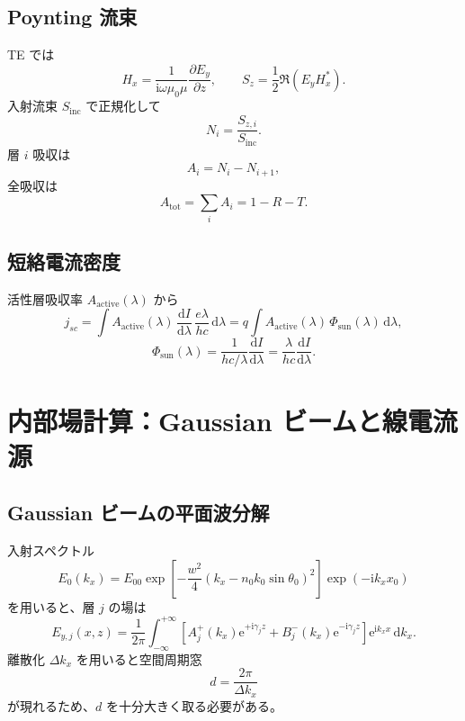\documentclass[a4paper,11pt]{article}
\newcommand{\ii}{\mathrm{i}}
\newcommand{\ee}{\mathrm{e}}
\newcommand{\dd}{\mathrm{d}}
\begin{document}
\subsection{Poynting 流束}
TE では
\begin{equation}
H_x=\frac{1}{\ii\omega\mu_0\mu}\frac{\partial E_y}{\partial z},
\qquad
S_z=\frac{1}{2}\Re\!\left(E_y H_x^\ast\right).
\end{equation}
入射流束 $S_{\mathrm{inc}}$ で正規化して
\begin{equation}
N_i=\frac{S_{z,i}}{S_{\mathrm{inc}}}.
\end{equation}
層 $i$ 吸収は
\begin{equation}
A_i=N_i-N_{i+1},
\end{equation}
全吸収は
\begin{equation}
A_{\mathrm{tot}}=\sum_i A_i=1-R-T.
\end{equation}

\subsection{短絡電流密度}
活性層吸収率 $A_{\mathrm{active}}(\lambda)$ から
\begin{equation}
j_{sc}
=
\int A_{\mathrm{active}}(\lambda)\,
\frac{\dd I}{\dd\lambda}\,
\frac{e\lambda}{hc}\,\dd\lambda
=
q\int A_{\mathrm{active}}(\lambda)\,\Phi_{\mathrm{sun}}(\lambda)\,\dd\lambda,
\end{equation}
\begin{equation}
\Phi_{\mathrm{sun}}(\lambda)=\frac{1}{hc/\lambda}\frac{\dd I}{\dd\lambda}
=\frac{\lambda}{hc}\frac{\dd I}{\dd\lambda}.
\end{equation}

\section{内部場計算：Gaussian ビームと線電流源}

\subsection{Gaussian ビームの平面波分解}
入射スペクトル
\begin{equation}
E_0(k_x)=E_{00}
\exp\!\left[-\frac{w^2}{4}\left(k_x-n_0k_0\sin\theta_0\right)^2\right]
\exp\!\left(-\ii k_x x_0\right)
\end{equation}
を用いると、層 $j$ の場は
\begin{equation}
E_{y,j}(x,z)=\frac{1}{2\pi}\int_{-\infty}^{+\infty}
\left[
A_j^+(k_x)\ee^{+\ii\gamma_j z}
+
B_j^-(k_x)\ee^{-\ii\gamma_j z}
\right]
\ee^{\ii k_x x}\,\dd k_x.
\end{equation}
離散化 $\Delta k_x$ を用いると空間周期窓
\begin{equation}
d=\frac{2\pi}{\Delta k_x}
\end{equation}
が現れるため、$d$ を十分大きく取る必要がある。
\end{document}

